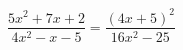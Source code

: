 \begin{ex}[type=equation]
	\begin{condition}
		$\dfrac{5x^2 + 7x + 2}{4x^2 - x - 5} = \dfrac{(4x + 5)^2}{16x^2 - 25}$
	\end{condition}
\end{ex}